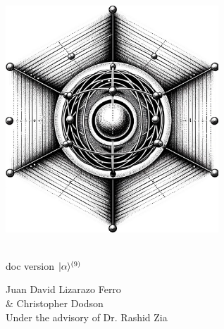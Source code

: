 \documentclass{article}
\begin{document}
 

\begin{titlepage} %
    \centering
    \vspace*{\fill}
    
    \includegraphics[width=0.6\textwidth]{ion_in_lattice.jpg} %
    \vspace*{1cm} %
    
    {\Large\qlanth}\\
    \vspace*{0.5cm}
    {\large doc version $|\alpha\rangle^{(9)}$}\\
    \vspace*{2cm}
    
    {\large Juan David Lizarazo Ferro}\\
    {\large \& Christopher Dodson}\\
    \vspace{0.5cm}
    {\large Under the advisory of Dr. Rashid Zia}\\
    \vspace*{\fill}
\end{titlepage}

\newpage

\vspace*{\fill}
\end{document}
